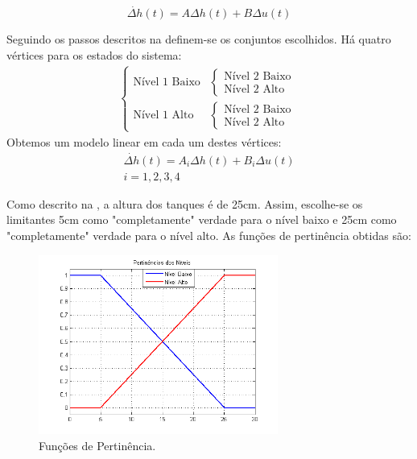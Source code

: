 	\begin{equation}
		\dot{\Delta h}(t) =  A \Delta h(t) +  B \Delta u(t)
	\end{equation}

Seguindo os passos descritos na  definem-se os conjuntos escolhidos. Há quatro vértices para os estados do sistema:
\begin{align}
	\begin{cases}
		\text{Nível 1 Baixo}
		&\begin{cases}
			\text{Nível 2 Baixo}\\
			\text{Nível 2 Alto}
		\end{cases}	\\
		\text{Nível 1 Alto}
		&\begin{cases}
			\text{Nível 2 Baixo}\\
			\text{Nível 2 Alto}
		\end{cases}
	\end{cases}
\end{align}
Obtemos um modelo linear em cada um destes vértices:
	\begin{align}
	\dot{\Delta h}(t) =  A_i \Delta h(t) +  B_i \Delta u(t) \\
	i = 1,2,3,4
	\end{align}


Como descrito na , a altura dos tanques é de 25cm. Assim, escolhe-se os limitantes 5cm como "completamente" verdade para o nível baixo e  25cm como "completamente" verdade para o nível alto. As funções de pertinência obtidas são:


\begin{figure}[H]
	\centering
	\includegraphics[width=0.7\textwidth]{img/pert_niveis.png}
	\caption{\label{figPertMod} Funções de Pertinência.}
\end{figure}

